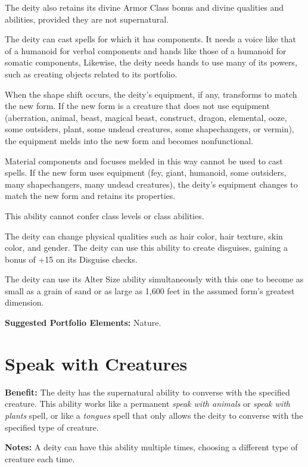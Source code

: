 \documentclass{article}
\begin{document}
The deity also retains its divine Armor Class bonus and divine qualities and abilities, 
provided they are not supernatural.

The deity can cast spells for which it has components. It needs a voice like that 
of a humanoid for verbal components and hands like those of a humanoid for somatic 
components, Likewise, the deity needs hands to use many of its powers, such as 
creating objects related to its portfolio.

When the shape shift occurs, the deity's equipment, if any, transforms to match 
the new form. If the new form is a creature that does not use equipment (aberration, 
animal, beast, magical beast, construct, dragon, elemental, ooze, some outsiders, 
plant, some undead creatures, some shapechangers, or vermin), the equipment melds 
into the new form and becomes nonfunctional.

Material components and focuses melded in this way cannot be used to cast spells. 
If the new form uses equipment (fey, giant, humanoid, some outsiders, many shapechangers, 
many undead creatures), the deity's equipment changes to match the new form and 
retains its properties.

This ability cannot confer class levels or class abilities.

The deity can change physical qualities such as hair color, hair texture, skin 
color, and gender. The deity can use this ability to create disguises, gaining 
a bonus of +15 on its Disguise checks.

The deity can use its Alter Size ability simultaneously with this one to become 
as small as a grain of sand or as large as 1,600 feet in the assumed form's greatest 
dimension.

\textbf{Suggested Portfolio Elements:} Nature.

\vspace{12pt}
\section*{Speak with Creatures}

\textbf{Benefit:} The deity has the supernatural ability to converse with the specified 
creature. This ability works like a permanent \textit{speak with animals }or \textit{speak 
with plants }spell, or like a \textit{tongues }spell that only allows the deity 
to converse with the specified type of creature.

\textbf{Notes:} A deity can have this ability multiple times, choosing a different 
type of creature each time.
\end{document}
